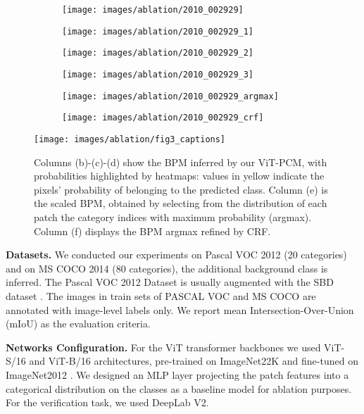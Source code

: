 \documentclass[runningheads]{styles/llncs}
\begin{document}
\begin{figure}[t]
\begin{subfigure}[t]{.15\linewidth}
\texttt{[image: images/ablation/2010\_002929]}
\end{subfigure}
\begin{subfigure}[t]{.15\linewidth}
\texttt{[image: images/ablation/2010\_002929\_1]}
\end{subfigure}
\begin{subfigure}[t]{.15\linewidth}
\texttt{[image: images/ablation/2010\_002929\_2]}
\end{subfigure}
\begin{subfigure}[t]{.15\linewidth}
\texttt{[image: images/ablation/2010\_002929\_3]}
\end{subfigure}
\begin{subfigure}[t]{.15\linewidth}
\texttt{[image: images/ablation/2010\_002929\_argmax]}
\end{subfigure}
\begin{subfigure}[t]{.15\linewidth}
\texttt{[image: images/ablation/2010\_002929\_crf]}
\end{subfigure}

\texttt{[image: images/ablation/fig3\_captions]}
\caption{Columns (b)-(c)-(d) show the BPM inferred by our ViT-PCM, with probabilities highlighted by  heatmaps: values in yellow indicate the pixels' probability of belonging to the predicted class. Column (e)  is the scaled BPM,  obtained by selecting from the distribution of each patch the category indices with maximum probability (argmax). Column  (f) displays the BPM argmax refined by CRF.}
\label{fig:ablatiob_argmax}
\end{figure} 
\noindent
{\bf Datasets.}
We conducted our experiments on Pascal VOC 2012 \cite{everingham2010pascal} (20 categories) and on MS COCO 2014\cite{lin2014microsoft} (80 categories), the additional background class is inferred. The Pascal VOC 2012 Dataset \cite{everingham2010pascal} is usually augmented with the SBD dataset \cite{hariharan2011semantic}. The images in train sets of PASCAL VOC and MS COCO are annotated with image-level labels
only. We report mean Intersection-Over-Union
(mIoU) as the evaluation criteria.

\baselineskip
\noindent
{\bf Networks Configuration.}
For the ViT transformer  backbones \cite{dosovitskiy2021image} we used ViT-S/16 and ViT-B/16 architectures, pre-trained on ImageNet22K  and fine-tuned on ImageNet2012 \cite{russakovsky2015imagenet}. We designed an MLP layer projecting the patch features into a categorical distribution on the  classes as a baseline model for ablation purposes. For the verification task, we used DeepLab V2\cite{chen2018encoder}.\
\end{document}
